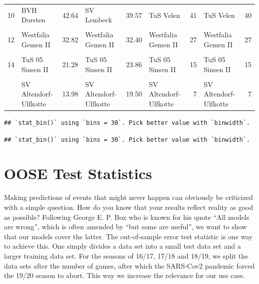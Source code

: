 \documentclass[12pt,a4paper]{article}
\begin{document}
\begin{table}[H]
{\begin{tabular}[t]{rlrlrlrlr}
10 & BVH Dorsten & 42.64 & SV Lembeck & 39.57 & TuS Velen & 41 & TuS Velen & 40\\
\addlinespace
\cellcolor{gray!6}{11} & \cellcolor{gray!6}{FC RW Dorsten} & \cellcolor{gray!6}{37.59} & \cellcolor{gray!6}{FC RW Dorsten} & \cellcolor{gray!6}{35.82} & \cellcolor{gray!6}{FC RW Dorsten} & \cellcolor{gray!6}{28} & \cellcolor{gray!6}{FC RW Dorsten} & \cellcolor{gray!6}{28}\\
12 & Westfalia Gemen II & 32.82 & Westfalia Gemen II & 32.40 & Westfalia Gemen II & 27 & Westfalia Gemen II & 27\\
\cellcolor{gray!6}{13} & \cellcolor{gray!6}{SC Reken II} & \cellcolor{gray!6}{27.60} & \cellcolor{gray!6}{SC Reken II} & \cellcolor{gray!6}{29.11} & \cellcolor{gray!6}{SC Reken II} & \cellcolor{gray!6}{25} & \cellcolor{gray!6}{SC Reken II} & \cellcolor{gray!6}{25}\\
14 & TuS 05 Sinsen II & 21.28 & TuS 05 Sinsen II & 23.86 & TuS 05 Sinsen II & 15 & TuS 05 Sinsen II & 15\\
\cellcolor{gray!6}{15} & \cellcolor{gray!6}{Adler Weseke II} & \cellcolor{gray!6}{18.88} & \cellcolor{gray!6}{Adler Weseke II} & \cellcolor{gray!6}{22.60} & \cellcolor{gray!6}{Adler Weseke II} & \cellcolor{gray!6}{15} & \cellcolor{gray!6}{Adler Weseke II} & \cellcolor{gray!6}{15}\\
\addlinespace
16 & SV Altendorf-Ulfkotte & 13.98 & SV Altendorf-Ulfkotte & 19.50 & SV Altendorf-Ulfkotte & 7 & SV Altendorf-Ulfkotte & 7\\
\bottomrule
\end{tabular}}
\end{table}

\begin{verbatim}
## `stat_bin()` using `bins = 30`. Pick better value with `binwidth`.
\end{verbatim}

\begin{verbatim}
## `stat_bin()` using `bins = 30`. Pick better value with `binwidth`.
\end{verbatim}

\hypertarget{oose-test-statistics}{%
\section{OOSE Test Statistics}\label{oose-test-statistics}}

Making predictions of events that might never happen can obviously be
criticized with a simple question. How do you know that your results
reflect reality as good as possible? Following George E. P. Box who is
known for his quote \enquote{All models are wrong}, which is often
amended by \enquote{but some are useful}, we want to show that our
models cover the latter. The out-of-sample error test statistic is one
way to achieve this. One simply divides a data set into a small test
data set and a larger training data set. For the seasons of 16/17, 17/18
and 18/19, we split the data sets after the number of games, after which
the SARS-Cov2 pandemic forced the 19/20 season to abort. This way we
increase the relevance for our use case.
\end{document}
